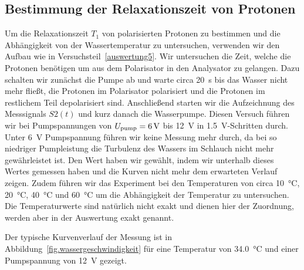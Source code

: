 \documentclass[paper=a4,
	fontsize=10pt,
	DIV=18,
	twocolumn,
	parskip=half
	]{scrartcl}
\numberwithin{equation}{section}    %
\begin{document}
\subsection{Bestimmung der Relaxationszeit von Protonen}
\label{auswertung7}

Um die Relaxationszeit $T_1$ von polarisierten Protonen zu bestimmen und die Abhängigkeit von der Wassertemperatur zu untersuchen, verwenden wir den Aufbau wie in Versuchsteil~\ref{auswertung5}. Wir untersuchen die Zeit, welche die Protonen benötigen um aus dem Polarisator in den Analysator zu gelangen. Dazu schalten wir zunächst die Pumpe ab und warte circa \SI{20}{\second} bis das Wasser nicht mehr fließt, die Protonen im Polarisator polarisiert und die Protonen im restlichem Teil depolarisiert sind. Anschließend starten wir die Aufzeichnung des Messsignals $S2(t)$ und kurz danach die Wasserpumpe. Diesen Versuch führen wir bei Pumpspannungen von $U_{\rm pump}=\SI{6}{\volt}$ bis \SI{12}{\volt} in \SI{1.5}{\volt}-Schritten durch. Unter \SI{6}{\volt} Pumpspannung führen wir keine Messung mehr durch, da bei so niedriger Pumpleistung die Turbulenz des Wassers im Schlauch nicht mehr gewährleistet ist. Den Wert haben wir gewählt, indem wir unterhalb dieses Wertes gemessen haben und die Kurven nicht mehr dem erwarteten Verlauf zeigen. Zudem führen wir das Experiment bei den Temperaturen von circa \SI{10}{\celsius}, \SI{20}{\celsius}, \SI{40}{\celsius} und \SI{60}{\celsius} um die Abhängigkeit der Temperatur zu untersuchen. Die Temperaturwerte sind natürlich nicht exakt und dienen hier der Zuordnung, werden aber in der Auswertung exakt genannt.

Der typische Kurvenverlauf der Messung ist in Abbildung~\ref{fig.wassergeschwindigkeit} für eine Temperatur von \SI{34.0}{\celsius} und einer Pumpspannung von \SI{12}{\volt} gezeigt.
\end{document}
